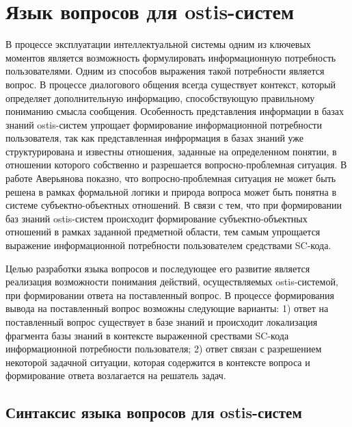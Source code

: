 \chapter{Язык вопросов для ostis-систем}
\label{chapter_requests}


В процессе эксплуатации интеллектуальной системы одним из ключевых моментов является возможность формулировать информационную потребность пользователями. Одним из способов выражения такой потребности является вопрос. В процессе диалогового общения всегда существует контекст, который определяет дополнительную информацию, способствующую правильному пониманию смысла сообщения. Особенность представления информации в базах знаний ostis-систем упрощает формирование информационной потребности пользователя, так как представленная инфрормация в базах знаний уже структурирована и известны отношения, заданные на определенном понятии, в отношении которого собственно и разрешается вопросно-проблемная ситуация. В работе Аверьянова показно, что вопросно-проблемная ситуация не может быть решена в рамках формальной логики и природа вопроса может быть понятна в системе субъектно-объектных отношений. В связи с тем, что при формировании баз знаний ostis-систем происходит формирование субъектно-объектных отношений в рамках заданной предметной области, тем самым упрощается выражение информационной потребности пользователем средствами SC-кода.   

Целью разработки языка вопросов и последующее его развитие является реализация возможности понимания действий, осуществляемых ostis-системой, при формировании ответа на поставленный вопрос. В процессе формирования вывода на поставленный вопрос возможны следующие варианты:
1) ответ на поставленный вопрос существует в базе знаний и происходит локализация фрагмента базы знаний в контексте выраженной срествами SC-кода информационной потребности пользователя;
2) ответ связан с разрешением некоторой задачной ситуации, которая содержится в контексте вопроса и формирование ответа возлагается на решатель задач.

\section{Синтаксис языка вопросов для ostis-систем}

